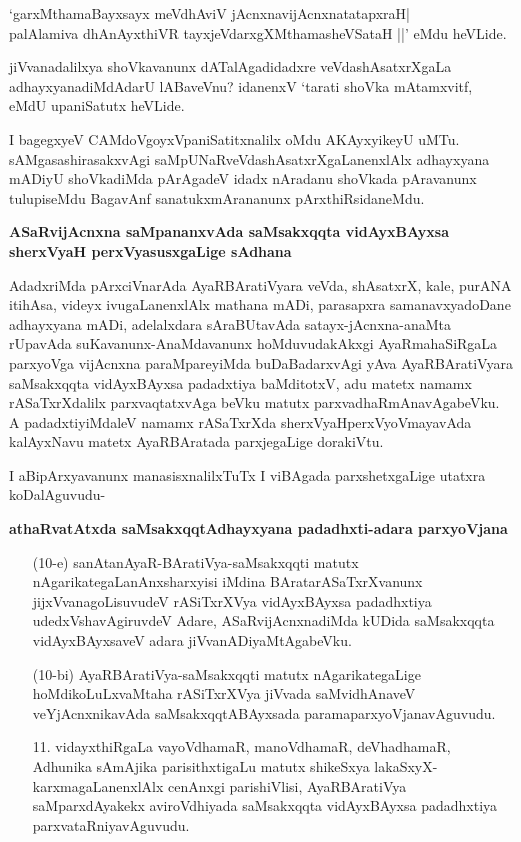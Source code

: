 \begin{shloka}
`garxMthamaBayxsayx meVdhAviV jAcnxnavijAcnxnatatapxraH|\\
palAlamiva dhAnAyxthiVR tayxjeVdarxgXMthamasheVSataH ||' eMdu heVLide.
\end{shloka}

jiVvanadalilxya shoVkavanunx dATalAgadidadxre veVdashAsatxrXgaLa adhayxyanadiMdAdarU lABaveVnu? idanenxV `tarati shoVka mAtamxvitf, eMdU upaniSatutx heVLide.

I bagegxyeV CAMdoVgoyxVpaniSatitxnalilx oMdu AKAyxyikeyU uMTu. sAMgasashirasakxvAgi saMpUNaRveVdashAsatxrXgaLanenxlAlx adhayxyana mADiyU shoVkadiMda pArAgadeV idadx nAradanu shoVkada pAravanunx tulupiseMdu BagavAnf sanatukxmArananunx pArxthiRsidaneMdu.

\textbf{ASaRvijAcnxna saMpananxvAda saMsakxqqta vidAyxBAyxsa sherxVyaH perxVyasusxgaLige sAdhana}

AdadxriMda pArxciVnarAda AyaRBAratiVyara veVda, shAsatxrX, kale, purANA itihAsa, videyx ivugaLanenxlAlx mathana mADi, parasapxra samanavxyadoDane adhayxyana mADi, adelalxdara sAraBUtavAda satayx-jAcnxna-anaMta rUpavAda suKavanunx-AnaMdavanunx hoMduvudakAkxgi AyaRmahaSiRgaLa parxyoVga vijAcnxna paraMpareyiMda buDaBadarxvAgi yAva AyaRBAratiVyara saMsakxqqta vidAyxBAyxsa \-padadxtiya baMditotxV, adu matetx namamx rASaTxrXdalilx parxvaqtatxvAga beVku matutx parxvadhaRmAnavAgabeVku. A padadxtiyiMdaleV namamx rASaTxrXda sherxVyaHperxVyoVmayavAda kalAyxNavu matetx AyaRBAratada parxjegaLige dorakiVtu.

I aBipArxyavanunx manasisxnalilxTuTx I viBAgada parxshetxgaLige utatxra koDalAguvudu-

\textbf{athaRvatAtxda saMsakxqqtAdhayxyana padadhxti-adara parxyoVjana}

\begin{itemize}
\item[(10-e)] sanAtanAyaR-BAratiVya-saMsakxqqti matutx nAgarikategaLanAnxsharxyisi iMdina BAratarASaTxrXvanunx jijxVvanagoLisuvudeV rASiTxrXVya vidAyxBAyxsa padadhxtiya udedxVshavAgiruvdeV Adare, ASaRvijAcnxnadiMda kUDida saMsakxqqta vidAyxBAyxsaveV adara jiVvanADiyaMtAgabeVku.

\item[(10-bi)] AyaRBAratiVya-saMsakxqqti matutx nAgarikategaLige hoMdikoLuLxvaMtaha rASiTxrXVya jiVvada saMvidhAnaveV veYjAcnxnikavAda saMsakxqqtABAyxsada paramaparxyoVjanavAguvudu. 

\item[11.] vidayxthiRgaLa vayoVdhamaR, manoVdhamaR, deVhadhamaR, Adhunika sAmAjika parisithxtigaLu matutx shikeSxya lakaSxyX-karxmagaLanenxlAlx cenAnxgi parishiVlisi, AyaRBAratiVya saMparxdAyakekx aviroVdhiyada saMsakxqqta vidAyxBAyxsa padadhxtiya parxvataRniyavAguvudu.
\end{itemize}

